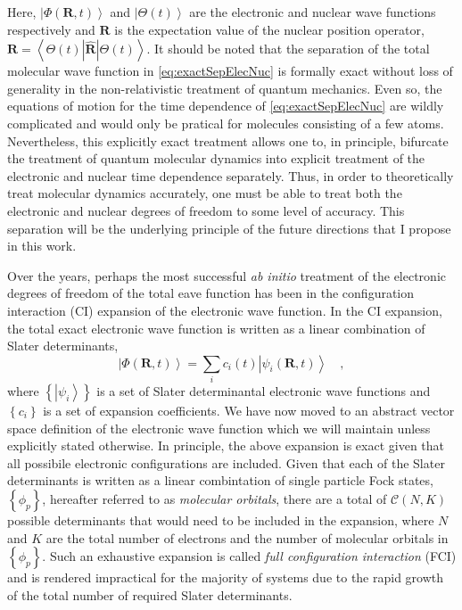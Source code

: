 \documentclass[12pt]{article}
\newcommand{\ket}[1]{\left\vert #1 \right\rangle}         %
\newcommand{\innerop}[3]{\left\langle #1 \left\vert #2 \right\vert #3 \right\rangle}  %
\newcommand*\vc[1]{\boldsymbol{#1}}
\begin{document}
Here, $\ket{\Phi(\vc{R},t)}$ and $\ket{\Theta (t)}$ are the electronic and
nuclear wave functions respectively and $\vc{R}$ is the expectation value of the
nuclear position operator, $\vc{R} = \innerop{\Theta (t)}{\hat{\vc{R}}}{\Theta
(t)}$.  It should be noted that the separation of the total molecular wave
function in \cref{eq:exactSepElecNuc} is formally exact\cite{Gross10_PRL123002,
Cederbaum08_JCP124101} without loss of generality in the non-relativistic
treatment of quantum mechanics. Even so, the equations of motion for the time
dependence of \cref{eq:exactSepElecNuc} are wildly complicated\cite{Ghosh15_MP1}
and would only be pratical for molecules consisting of a few atoms.
Nevertheless, this explicitly exact treatment allows one to, in principle,
bifurcate the treatment of quantum molecular dynamics into explicit treatment of
the electronic and nuclear time dependence separately. Thus, in order to
theoretically treat molecular dynamics accurately, one must be able to treat
both the electronic and nuclear degrees of freedom to some level of accuracy.
This separation will be the underlying principle of the future directions that I
propose in this work.

Over the years, perhaps the most successful \emph{ab initio} treatment of the
electronic degrees of freedom of the total eave function has been in the
configuration interaction (CI) expansion of the electronic wave function. In the
CI expansion, the total exact electronic wave function is written as a linear
combination of Slater determinants,
\begin{equation}
\ket{\Phi (\vc{R},t)} = \sum_i c_i(t) \ket{\psi_i (\vc{R},t)}
\quad ,
\label{eq:CIExp}
\end{equation}
where $\left\lbrace\ket{\psi_i}\right\rbrace$ is a set of Slater determinantal
electronic wave functions and $\left\lbrace c_i \right\rbrace$ is a set of
expansion coefficients. We have now moved to an abstract vector space definition
of the electronic wave function which we will maintain unless explicitly stated
otherwise. In principle, the above expansion is exact given that all possibile
electronic configurations are included. Given that each of the Slater
determinants is written as a linear combintation of single particle Fock states,
$\left\lbrace \phi_p \right\rbrace$, hereafter referred to as \emph{molecular
orbitals}, there are a total of $\mathcal{C}(N,K)$ possible determinants that
would need to be included in the expansion, where $N$ and $K$ are the total
number of electrons and the number of molecular orbitals in 
$\left\lbrace \phi_p \right\rbrace$. Such an exhaustive expansion is called
\emph{full configuration interaction} (FCI) and is rendered impractical for the
majority of systems due to the rapid growth of the total number of required
Slater determinants.
\end{document}
